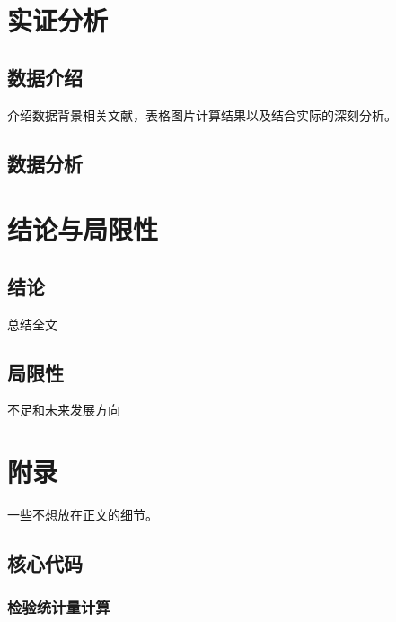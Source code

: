 \documentclass{SUFEThesis}
\begin{document}
\section{实证分析}
\subsection{数据介绍}
介绍数据背景相关文献，表格图片计算结果以及结合实际的深刻分析。


\subsection{数据分析}


\section{结论与局限性}
\subsection{结论}
总结全文
\subsection{局限性}
不足和未来发展方向

\newpage


 
\section{附录}
一些不想放在正文的细节。
\subsection{核心代码}
\subsubsection{检验统计量计算}
% 

%  
\end{document}
